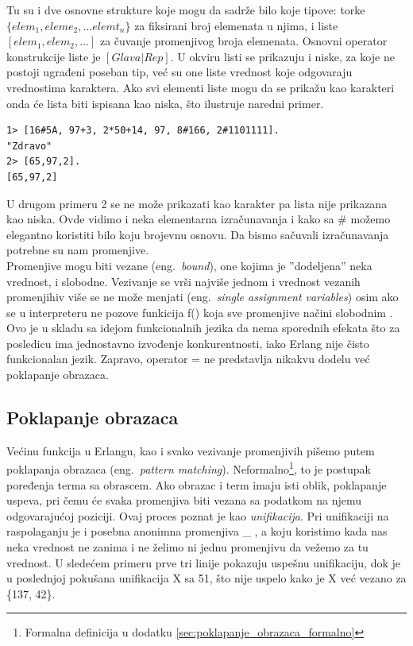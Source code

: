 \documentclass[a4paper]{article}
\begin{document}
{Tu su i dve osnovne strukture koje mogu da sadrže bilo koje tipove: torke $\{elem_1, eleme_2, ... elemt_n\}$ za fiksirani broj elemenata u njima, 
i liste $[elem_1, elem_2, ...]$ za čuvanje promenjivog broja elemenata. 
Osnovni operator konstrukcije liste je $[Glava | Rep]$. 
U okviru listi se prikazuju i niske, za koje ne postoji ugrađeni poseban tip, 
već su one liste vrednost koje odgovaraju vrednostima karaktera. Ako svi elementi liste mogu da se prikažu kao karakteri onda će lista biti ispisana kao niska, što ilustruje naredni primer.
\begin{verbatim}
1> [16#5A, 97+3, 2*50+14, 97, 8#166, 2#1101111].
"Zdravo"
2> [65,97,2].
[65,97,2]
\end{verbatim}
U drugom primeru 2 se ne može prikazati kao karakter pa lista nije prikazana kao niska. 
Ovde vidimo i neka elementarna izračunavanja i kako sa \# možemo elegantno koristiti bilo koju brojevnu osnovu. 
Da bismo sačuvali izračunavanja potrebne su nam promenjive.\\

Promenjive mogu biti vezane (eng.~{\em bound}), one kojima je ''dodeljena'' neka vrednost, i slobodne. 
Vezivanje se vrši najviše jednom i vrednost vezanih promenjihiv više se ne može menjati (eng.~{\em single assignment variables}) 
osim ako se u interpreteru ne pozove funkicija f() koja sve promenjive načini slobodnim \cite{book_fred}. 
Ovo je u skladu sa idejom funkcionalnih jezika da nema sporednih efekata 
što za posledicu ima jednostavno izvođenje konkurentnosti, 
iako Erlang nije čisto funkcionalan jezik.
Zapravo, operator = ne predstavlja nikakvu dodelu već poklapanje obrazaca.


\subsection{Poklapanje obrazaca}
Većinu funkcija u Erlangu, kao i svako vezivanje promenjivih pišemo putem poklapanja obrazaca (eng.~{\em pattern matching}). Neformalno\footnote{ Formalna definicija u dodatku \ref{sec:poklapanje_obrazaca_formalno}}, to je postupak poređenja terma sa obrascem. Ako obrazac i term imaju isti oblik, poklapanje uspeva, pri čemu će svaka promenjiva biti vezana sa podatkom na njemu odgovarajućoj poziciji. 
Ovaj proces poznat je kao {\em unifikacija}. 
Pri unifikaciji na raspolaganju je i posebna anonimna promenjiva \_ , a koju koristimo kada nas neka vrednost ne zanima i ne želimo ni jednu promenjivu da vežemo za tu vrednost. U sledećem primeru prve tri linije pokazuju uspešnu unifikaciju, dok je u poslednjoj pokušana unifikacija X sa 51, što nije uspelo kako je X već vezano za \{137, 42\}.

}
\end{document}
